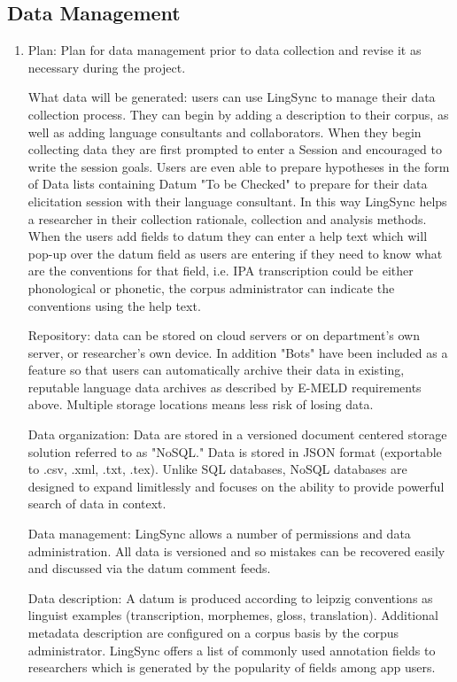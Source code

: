\documentclass[12pt]{article}
\begin{document}
\subsection {Data Management }

\begin{enumerate} 

\item Plan: Plan for data management prior to data collection and revise it as necessary during the project. 


What data will be generated: users can use LingSync to manage their data collection process. They can begin by adding a description to their corpus, as well as adding language consultants and collaborators. When they begin collecting data they are first prompted to enter a Session and encouraged to write the session goals. Users are even able to prepare hypotheses in the form of Data lists containing Datum "To be Checked" to prepare for their data elicitation session with their language consultant. In this way LingSync helps a researcher in their collection rationale, collection and analysis methods. When the users add fields to datum they can enter a help text which will pop-up over the datum field as users are entering if they need to know what are the conventions for that field, i.e. IPA transcription could be either phonological or phonetic, the corpus administrator can indicate the conventions using the help text. 

Repository:  data can be stored on cloud servers or on department's own server, or researcher's own device. In addition "Bots" have been included as a feature so that users can automatically archive their data in existing, reputable language data archives as described by E-MELD requirements above. Multiple storage locations means less risk of losing data.

Data organization: Data are stored in a versioned document centered storage solution referred to as "NoSQL." Data is stored in JSON format (exportable to .csv, .xml, .txt, .tex). Unlike SQL databases, NoSQL databases are designed to expand limitlessly and focuses on the ability to provide powerful search of data in context.

Data management: LingSync allows a number of permissions and data administration. All data is versioned and so mistakes can be recovered easily and discussed via the datum comment feeds. 

Data description: A datum is produced according to leipzig conventions as linguist examples (transcription, morphemes, gloss, translation). Additional metadata description are configured on a corpus basis by the corpus administrator. LingSync offers a list of commonly used annotation fields to researchers which is generated by the popularity of fields among app users. 


\end{enumerate}
\end{document}
